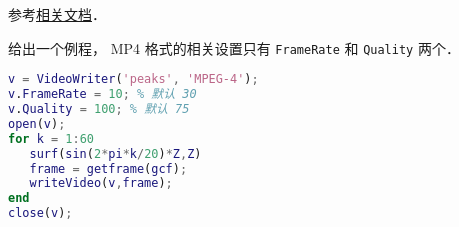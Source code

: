 
\begin{issues}
\issueDraft
\end{issues}


参考\href{https://www.mathworks.com/help/matlab/ref/videowriter.html}{相关文档}．

给出一个例程， MP4 格式的相关设置只有 \verb|FrameRate| 和 \verb|Quality| 两个．
\begin{lstlisting}[language=matlab]
% 写 mp4 视频
v = VideoWriter('peaks', 'MPEG-4');
v.FrameRate = 10; % 默认 30
v.Quality = 100; % 默认 75
open(v);
for k = 1:60 
   surf(sin(2*pi*k/20)*Z,Z)
   frame = getframe(gcf);
   writeVideo(v,frame);
end
close(v);
\end{lstlisting}
